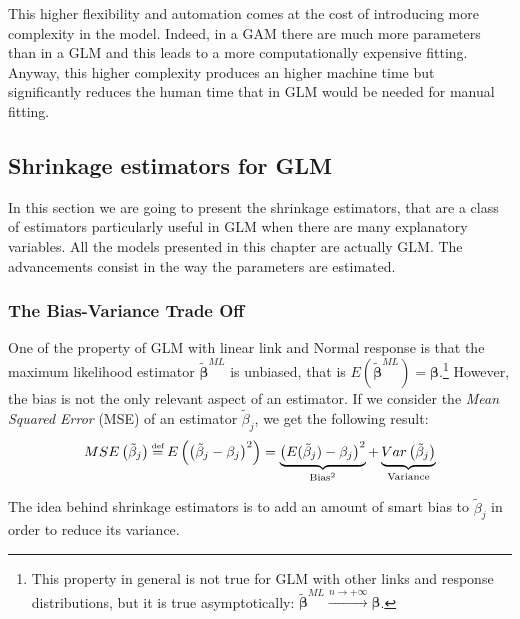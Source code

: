 \documentclass[a4paper, nobind]{templates/ociamthesis}
\newcommand\eqdef{\mathrel{\overset{\makebox[0pt]{\mbox{\normalfont\tiny def}}}{=}}}
\theoremstyle{definition}
\theoremstyle{definition}
\theoremstyle{definition}
\theoremstyle{remark}
\begin{document}
This higher flexibility and automation comes at the cost of introducing more complexity in the model. Indeed, in a GAM there are much more parameters than in a GLM and this leads to a more computationally expensive fitting. Anyway, this higher complexity produces an higher machine time but significantly reduces the human time that in GLM would be needed for manual fitting.

\newpage

\hypertarget{chap:shrinkage-estimators}{%
\subsection{Shrinkage estimators for GLM}\label{chap:shrinkage-estimators}}

In this section we are going to present the shrinkage estimators, that are a class of estimators particularly useful in GLM when there are many explanatory variables. All the models presented in this chapter are actually GLM. The advancements consist in the way the parameters are estimated.

\hypertarget{the-bias-variance-trade-off}{%
\subsubsection{The Bias-Variance Trade Off}\label{the-bias-variance-trade-off}}

One of the property of GLM with linear link and Normal response is that the maximum likelihood estimator \(\boldsymbol{\tilde{\beta}}^{ML}\) is unbiased, that is \(E\left(\boldsymbol{\tilde{\beta}}^{ML}\right) = \boldsymbol{\beta}\).\footnote{This property in general is not true for GLM with other links and response distributions, but it is true asymptotically: \(\boldsymbol{\tilde{\beta}}^{ML} \xrightarrow{n\to+\infty} \boldsymbol{\beta}\).} However, the bias is not the only relevant aspect of an estimator. If we consider the \emph{Mean Squared Error} (MSE) of an estimator \(\tilde{\beta}_j\), we get the following result:
\begin{equation}
\label{eq:bias-variance}
MSE\left(\tilde{\beta}_j\right) \eqdef E\left(\left(\tilde{\beta}_j - \beta_j\right)^2\right) =
\underbrace{\left( E(\tilde{\beta}_j)-\beta_j \right)^2}_{\text{Bias}^2} + 
\underbrace{Var\left( \tilde{\beta}_j \right)}_{\text{Variance}}
\end{equation}

The idea behind shrinkage estimators is to add an amount of smart bias to \(\tilde{\beta}_j\) in order to reduce its variance.
\end{document}
